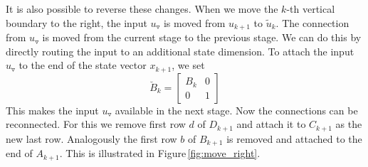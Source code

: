 \documentclass[numbers=noenddot,doctype=mastersthesis,BCOR=15mm,biblatex]{ldvbook}%
\newcommand{\m}{\triangledown} %
\begin{document}
It is also possible to reverse these changes.
When we move the $k$-th vertical boundary to the right, the input $u_\m$ is moved from $u_{k+1}$ to $\tilde{u}_k$.
The connection from $u_\m$ is moved from the current stage to the previous stage.
We can do this by directly routing the input to an additional state dimension.
To attach the input $u_\m$ to the end of the state vector $x_{k+1}$, we set 
\begin{equation}
	\breve{B}_k = \begin{bmatrix}
	B_k & 0\\
	0 & 1
	\end{bmatrix}
\end{equation}
This makes the input $u_\m$ available in the next stage.
Now the connections can be reconnected.
For this we remove first row $d$ of $D_{k+1}$ and attach it to $C_{k+1}$ as the new last row. 
Analogously the first row $b$ of $B_{k+1}$ is removed and attached to the end of $A_{k+1}$.
This is illustrated in Figure\,\ref{fig:move_right}.
\end{document}

